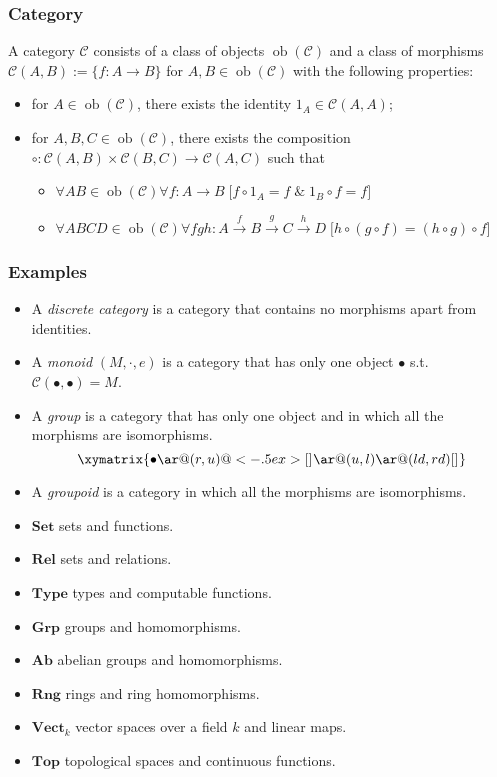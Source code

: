 \documentclass[UTF8,aspectratio=43,11pt,colorlinks,compress,openany]{beamer}%
\begin{document}
\begin{frame}\frametitle{Category}
\begin{definition}[Category]
A category $\mathcal{C}$ consists of a class of objects $\operatorname{ob}(\mathcal{C})$ and a class of morphisms $\mathcal{C}(A,B):=\{f: A\to B\}$ for $A,B\in\operatorname{ob}(\mathcal{C})$ with the following properties:
\begin{itemize}
	\item for $A\in\operatorname{ob}(\mathcal{C})$, there exists the identity $1_A\in\mathcal{C}(A,A)$;
	\item for $A,B,C\in\operatorname{ob}(\mathcal{C})$, there exists the composition $\circ:\mathcal{C}(A,B)\times\mathcal{C}(B,C)\to\mathcal{C}(A,C)$ such that
		\begin{itemize}
			\item $\forall AB\in\operatorname{ob}(\mathcal{C})\forall f: A\to B\;\big[f\circ1_A=f\;\&\;1_B\circ f=f\big]$
			\item $\forall ABCD\in\operatorname{ob}(\mathcal{C})\forall fgh: A\xrightarrow{f}B\xrightarrow{g}C\xrightarrow{h}D\;\big[h\circ(g\circ f)=(h\circ g)\circ f\big]$
		\end{itemize}
\end{itemize}
\end{definition}
\end{frame}

\begin{frame}\frametitle{Examples}
\setlength\abovedisplayskip{0pt}
\setlength\belowdisplayskip{0pt}
\begin{itemize}
	\item A \emph{discrete category} is a category that contains no morphisms apart from identities.
	\item A \emph{monoid} $(M,\cdot,e)$ is a category that has only one object $\bullet$ s.t. $\mathcal{C}(\bullet,\bullet)=M$.
	\item A \emph{group} is a category that has only one object and in which all the morphisms are isomorphisms.\vspace*{-1ex}
\[
\xymatrix{\bullet \ar@(r,u)@<-.5ex>[]_{} \ar@(u,l) \ar@(ld,rd)[]_{}}
\]
	\item A \emph{groupoid} is a category in which all the morphisms are isomorphisms.
\end{itemize}
\begin{itemize}
	\item $\mathbf{Set}$ sets and functions.
	\item $\mathbf{Rel}$ sets and relations.
	\item $\mathbf{Type}$ types and computable functions.
	\item $\mathbf{Grp}$ groups and homomorphisms.
	\item $\mathbf{Ab}$ abelian groups and homomorphisms.
	\item $\mathbf{Rng}$ rings and ring homomorphisms.
	\item $\mathbf{Vect}_k$ vector spaces over a field $k$ and linear maps.
	\item $\mathbf{Top}$ topological spaces and continuous functions.
\end{itemize}
\end{frame}
\end{document}
